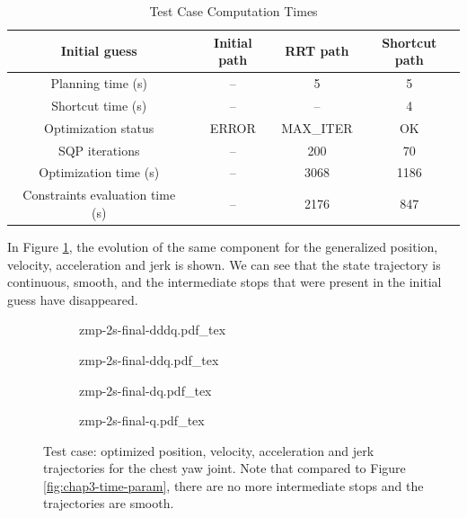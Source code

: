 \begin{table}
  \renewcommand{\arraystretch}{1.3}
  \caption{Test Case Computation Times}
  \label{table}
  \centering
  \begin{tabular}{|c||c|c|c|}
    \hline
    Initial guess & Initial path & RRT path & Shortcut path \\
    \hline
    Planning time (s) & -- & 5 & 5 \\
    \hline
    Shortcut time (s) & -- & -- & 4 \\
    \hline
    Optimization status & ERROR & MAX\_ITER & OK \\
    \hline
    SQP iterations & -- & 200 & 70 \\
    \hline
    Optimization time (s) & -- & 3068 & 1186 \\
    \hline
    Constraints evaluation time (s) & -- & 2176 & 847 \\
    \hline
  \end{tabular}
\end{table}

In Figure \ref{fig:chap3-zmp-2s-final-ux}, the evolution of the same
component for the generalized position, velocity, acceleration and
jerk is shown. We can see that the state trajectory is continuous,
smooth, and the intermediate stops that were present in the initial
guess have disappeared.

\begin{figure}
  \centering
  \begin{subfigure}{0.49\columnwidth}
    \centering
        {\def\svgwidth{\linewidth}
          {\tiny
            
                       {zmp-2s-final-dddq.pdf_tex}
          }
        }
  \end{subfigure}
  \begin{subfigure}{0.5\columnwidth}
    \centering
        {\def\svgwidth{\linewidth}
          {\tiny
            
                       {zmp-2s-final-ddq.pdf_tex}
          }
        }
  \end{subfigure}
  \begin{subfigure}{0.49\columnwidth}
    \centering
        {\def\svgwidth{\linewidth}
          {\tiny
            
                       {zmp-2s-final-dq.pdf_tex}
          }
        }
  \end{subfigure}
  \begin{subfigure}{0.5\columnwidth}
    \centering
        {\def\svgwidth{\linewidth}
          {\tiny
            
                       {zmp-2s-final-q.pdf_tex}
          }
        }
  \end{subfigure}
  \caption{Test case: optimized position, velocity, acceleration and
    jerk trajectories for the chest yaw joint. Note that compared to
    Figure \ref{fig:chap3-time-param}, there are no more intermediate
    stops and the trajectories are smooth.}
  \label{fig:chap3-zmp-2s-final-ux}
\end{figure}

